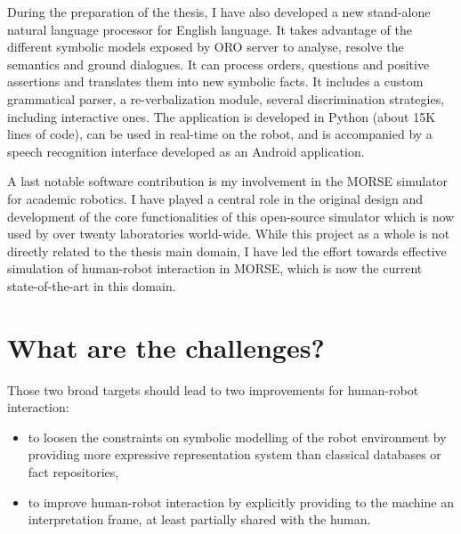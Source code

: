 During the preparation of the thesis, I have also developed a new stand-alone
natural language processor for English language. It takes advantage of the
different symbolic models exposed by ORO server to analyse, resolve the
semantics and ground dialogues. It can process orders, questions and positive
assertions and translates them into new symbolic facts. It includes a custom
grammatical parser, a re-verbalization module, several discrimination
strategies, including interactive ones. The application is developed in Python
(about 15K lines of code), can be used in real-time on the robot, and is
accompanied by a speech recognition interface developed as an Android
application.

A last notable software contribution is my involvement in the MORSE simulator
for academic robotics. I have played a central role in the original design and
development of the core functionalities of this open-source simulator which is
now used by over twenty laboratories world-wide. While this project as a whole
is not directly related to the thesis main domain, I have led the effort towards
effective simulation of human-robot interaction in MORSE, which is now the
current state-of-the-art in this domain.



\section{What are the challenges?}
\label{sect|scenario-challenges}

Those two broad targets should lead to two improvements for human-robot
interaction:


\begin{itemize}
	\item to loosen the constraints on symbolic modelling of the robot
	environment by providing more expressive representation system than
	classical databases or fact repositories,

	\item to improve human-robot interaction by explicitly providing to the
	machine an interpretation frame, at least partially shared with the human.

\end{itemize}


